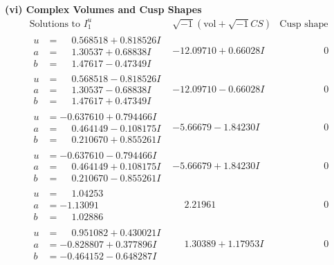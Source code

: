 \documentclass[1p]{elsarticle_modified}
\theoremstyle{definition}
\newcommand{\I}{\sqrt{-1}}
\begin{document}
\newpage\flushleft \textbf{(vi) Complex Volumes and Cusp Shapes}
$$\begin{array}{c|c|c}  
\text{Solutions to }I^u_{1}& \I (\text{vol} + \sqrt{-1}CS) & \text{Cusp shape}\\
 \hline 
\begin{aligned}
u &= \phantom{-}0.568518 + 0.818526 I \\
a &= \phantom{-}1.30537 + 0.68838 I \\
b &= \phantom{-}1.47617 - 0.47349 I\end{aligned}
 & -12.09710 + 0.66028 I & \phantom{-0.000000 } 0 \\ \hline\begin{aligned}
u &= \phantom{-}0.568518 - 0.818526 I \\
a &= \phantom{-}1.30537 - 0.68838 I \\
b &= \phantom{-}1.47617 + 0.47349 I\end{aligned}
 & -12.09710 - 0.66028 I & \phantom{-0.000000 } 0 \\ \hline\begin{aligned}
u &= -0.637610 + 0.794466 I \\
a &= \phantom{-}0.464149 - 0.108175 I \\
b &= \phantom{-}0.210670 + 0.855261 I\end{aligned}
 & -5.66679 - 1.84230 I & \phantom{-0.000000 } 0 \\ \hline\begin{aligned}
u &= -0.637610 - 0.794466 I \\
a &= \phantom{-}0.464149 + 0.108175 I \\
b &= \phantom{-}0.210670 - 0.855261 I\end{aligned}
 & -5.66679 + 1.84230 I & \phantom{-0.000000 } 0 \\ \hline\begin{aligned}
u &= \phantom{-}1.04253\phantom{ +0.000000I} \\
a &= -1.13091\phantom{ +0.000000I} \\
b &= \phantom{-}1.02886\phantom{ +0.000000I}\end{aligned}
 & \phantom{-}2.21961\phantom{ +0.000000I} & \phantom{-0.000000 } 0 \\ \hline\begin{aligned}
u &= \phantom{-}0.951082 + 0.430021 I \\
a &= -0.828807 + 0.377896 I \\
b &= -0.464152 - 0.648287 I\end{aligned}
 & \phantom{-}1.30389 + 1.17953 I & \phantom{-0.000000 } 0 \\ \hline\begin{aligned}

\end{aligned}
\end{array}$$
\end{document}
